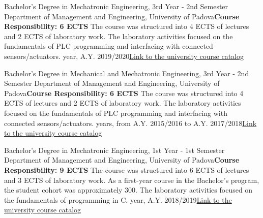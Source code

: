{
{Bachelor's Degree in Mechatronic Engineering, 3rd Year - 2nd Semester}
{\newline  Department of Management and Engineering, University of Padova\newline \textbf{Course Responsibility: 6 ECTS}\newline
    The course was structured into 4 ECTS of lectures and 2 ECTS of laboratory work. The laboratory activities focused on the fundamentals of PLC programming and interfacing with connected sensors/actuators.}{ year, A.Y. 2019/2020}{\href{https://didattica.unipd.it/off/2017/LT/IN/IN2376/000ZZ/INP7078641/N0}{Link to the university course catalog}}

{Bachelor's Degree in Mechanical and Mechatronic Engineering, 3rd Year - 2nd Semester}
{\newline  Department of Management and Engineering, University of Padova\newline \textbf{Course Responsibility: 6 ECTS}\newline
    The course was structured into 4 ECTS of lectures and 2 ECTS of laboratory work. The laboratory activities focused on the fundamentals of PLC programming and interfacing with connected sensors/actuators.}{ years, from A.Y. 2015/2016 to A.Y. 2017/2018}{\href{https://didattica.unipd.it/off/2015/LT/IN/IN0516/000ZZ/INP3058418/N0}{Link to the university course catalog}}


    {Bachelor's Degree in Mechatronic Engineering, 1st Year - 1st Semester}
    {\newline  Department of Management and Engineering, University of Padova\newline \textbf{Course Responsibility: 9 ECTS}\newline
        The course was structured into 6 ECTS of lectures and 3 ECTS of laboratory work. As a first-year course in the Bachelor's program, the student cohort was approximately 300. The laboratory activities focused on the fundamentals of programming in C.}{ year, A.Y. 2018/2019}{\href{https://didattica.unipd.it/off/2018/LT/IN/IN2376/000ZZ/IN18103361/N0}{Link to the university course catalog}}

}
